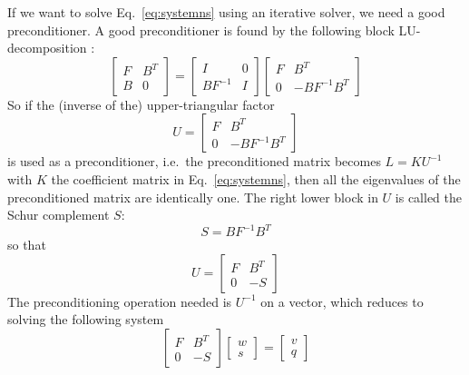 If we want to solve Eq.~\eqref{eq:systemns} using an iterative solver, we need 
a good preconditioner. A good preconditioner is found by the following block
LU-decomposition \cite{Elman05}:
\begin{equation}
  \begin{bmatrix}
    F & B^T \\ 
    B & 0
  \end{bmatrix}=
  \begin{bmatrix}
    I & 0 \\ 
    BF^{-1} & I
  \end{bmatrix}
  \begin{bmatrix}
    F & B^T \\ 
    0 & -BF^{-1}B^T
  \end{bmatrix}
\end{equation}
So if the (inverse of the) upper-triangular factor
\begin{equation}
   U=  \begin{bmatrix}
    F & B^T \\ 
    0 & -BF^{-1}B^T
  \end{bmatrix}
\end{equation}
is used as a preconditioner, i.e.\ the preconditioned matrix becomes
$L=KU^{-1}$ with $K$ the coefficient matrix in Eq.~\eqref{eq:systemns}, then
all the eigenvalues of the preconditioned matrix are identically one. The right
lower block in $U$ is called the Schur complement $S$:
\begin{equation}
   S=BF^{-1}B^T
\end{equation}
so that
\begin{equation}
   U=  \begin{bmatrix}
    F & B^T \\ 
    0 & -S
  \end{bmatrix}
\end{equation}
The preconditioning operation needed is $U^{-1}$ on a vector, which reduces to
solving the following system
\begin{equation}
  \begin{bmatrix}
    F & B^T \\ 
    0 & -S
  \end{bmatrix}
  \begin{bmatrix}
     w \\ s
  \end{bmatrix}=
  \begin{bmatrix}
     v \\ q
  \end{bmatrix}
\end{equation}
